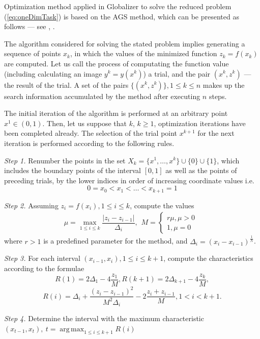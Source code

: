 \documentclass[runningheads]{llncs}
\DeclareMathOperator*{\argmax}{arg\,max}
\begin{document}
Optimization method applied in Globalizer \cite{globalizerSystem} to solve the reduced problem
(\ref{eq:oneDimTask}) is based on the AGS method, which can be presented as follows ---
see \cite{strongin1978}, \cite{strSergGO}.
\par
The algorithm considered for solving the stated problem implies generating
a sequence of points \(x_k\), in which the values of the minimized function \(z_k = f(x_k)\)
are computed. Let us call the process of computating the function value
(including calculating an image \(y^k=y(x^k)\)) a trial, and the pair \((x^k,z^k)\) ---
the result of the trial. A set of the pairs \(\{(x^k,z^k)\}, 1\leqslant k\leqslant n\)
makes up the search information accumulated by the method after executing \(n\) steps.
\par
The initial iteration of the algorithm is performed at an arbitrary point \mbox{\(x^1\in(0,1)\)}.
Then, let us suppose that \(k\), \(k\ge 1\), optimization iterations have been completed already.
The selection of the trial point \(x^{k+1}\) for the next iteration is performed according to the
following rules.

\textit{Step 1.} Renumber the points in the set \(X_k=\{x^1,\dotsc,x^k\}\cup\{0\}\cup\{1\}\),
which includes the boundary points of the interval \([0,1]\) as well as the points of
preceding trials, by the lower indices in order of increasing coordinate values  i.e.
\begin{displaymath}
0=x_0<x_1<\dotsc<x_{k+1}=1
\end{displaymath}
\par
\textit{Step 2.} Assuming \(z_i=f(x_i),1\leqslant i\leqslant k\), compute the values
\begin{equation}
\label{eq:step2}
\mu=\max_{1\leqslant i\leqslant k}\dfrac{|z_i-z_{i-1}|}{\Delta_i},
\begin{matrix}
    M =
    \left\{
    \begin{matrix}
    r\mu,\mu>0 \\
    1,\mu=0
    \end{matrix} \right.
    \end{matrix}
\end{equation}
where \(r>1\) is a predefined parameter for the method, and \(\Delta_i=(x_i-x_{i-1})^\frac{1}{N}\).
\par
\textit{Step 3.} For each interval \((x_{i-1},x_i),1\leqslant i\leqslant k+1\), compute the
characteristics according to the formulae
\begin{equation}
\label{step3_1}
R(1)=2\Delta_1-4\dfrac{z_1}{M},R(k+1)=2\Delta_{k+1}-4\dfrac{z_k}{M},
\end{equation}
\begin{equation}
\label{eq:step3_2}
R(i)=\Delta_i+\dfrac{(z_i-z_{i-1})^2}{M^2\Delta_i}-2\dfrac{z_i+z_{i-1}}{M},1<i<k+1.
\end{equation}
\par
\textit{Step 4.} Determine the interval with the maximum characteristic \((x_{t-1}, x_t),\:t=\argmax_{1\leqslant i \leqslant k+1}R(i)\)
\end{document}
